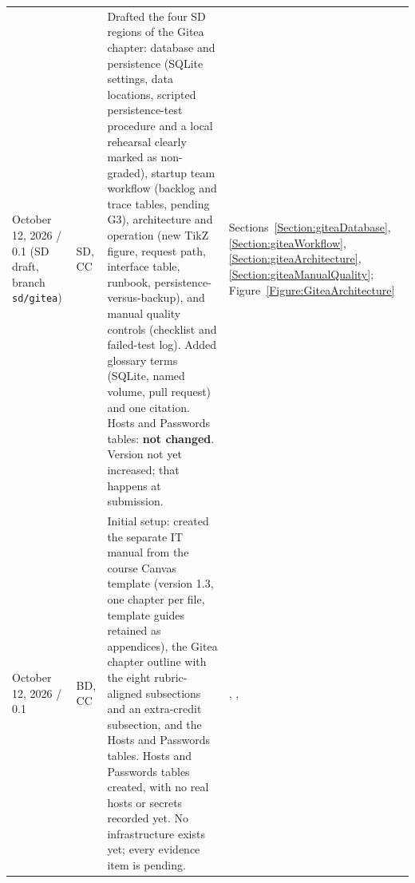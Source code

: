 \begin{tabularx}{\linewidth}{L{3.1cm}L{2.2cm}YL{2.0cm}}
October 12, 2026 / 0.1 (SD draft, branch \texttt{sd/gitea}) & SD, CC & Drafted the four SD regions of the Gitea chapter: database and persistence (SQLite settings, data locations, scripted persistence-test procedure and a local rehearsal clearly marked as non-graded), startup team workflow (backlog and trace tables, pending G3), architecture and operation (new TikZ figure, request path, interface table, runbook, persistence-versus-backup), and manual quality controls (checklist and failed-test log). Added glossary terms (SQLite, named volume, pull request) and one citation. Hosts and Passwords tables: \textbf{not changed}. Version not yet increased; that happens at submission. & Sections~\ref{Section:giteaDatabase}, \ref{Section:giteaWorkflow}, \ref{Section:giteaArchitecture}, \ref{Section:giteaManualQuality}; Figure~\ref{Figure:GiteaArchitecture}\\
October 12, 2026 / 0.1 & BD, CC & Initial setup: created the separate IT manual from the course Canvas template (version 1.3, one chapter per file, template guides retained as appendices), the Gitea chapter outline with the eight rubric-aligned subsections and an extra-credit subsection, and the Hosts and Passwords tables. Hosts and Passwords tables created, with no real hosts or secrets recorded yet. No infrastructure exists yet; every evidence item is pending. & , , \\
\end{tabularx}
